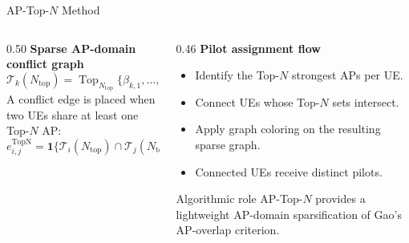 \documentclass[10pt,aspectratio=169]{beamer}
\newcommand{\TopN}{AP-Top-$N$}
\newenvironment{tightitemize}{%
    \begin{itemize}
        \setlength{\itemsep}{2pt}
        \setlength{\parskip}{0pt}
        \setlength{\parsep}{0pt}
}{%
    \end{itemize}
}
\begin{document}
\begin{frame}{AP-Top-\(N\) Method}
    \small
    \begin{columns}[T,onlytextwidth]
        \begin{column}{0.50\textwidth}
            \textbf{Sparse AP-domain conflict graph}
            \[
                \mathcal{T}_k(N_{\mathrm{top}})
                =
                \operatorname{Top}_{N_{\mathrm{top}}}
                \{\beta_{k,1},\ldots,\beta_{k,L}\}.
            \]
            A conflict edge is placed when two UEs share at least one Top-\(N\) AP:
            \[
                e_{i,j}^{\mathrm{TopN}}
                =
                \mathbf{1}\{
                \mathcal{T}_i(N_{\mathrm{top}})
                \cap
                \mathcal{T}_j(N_{\mathrm{top}})
                \neq \varnothing
                \}.
            \]
        \end{column}
        \begin{column}{0.46\textwidth}
            \textbf{Pilot assignment flow}
            \begin{tightitemize}
                \item Identify the Top-\(N\) strongest APs per UE.
                \item Connect UEs whose Top-\(N\) sets intersect.
                \item Apply graph coloring on the resulting sparse graph.
                \item Connected UEs receive distinct pilots.
            \end{tightitemize}

            \vspace{0.6em}
            \begin{block}{Algorithmic role}
                \TopN{} provides a lightweight AP-domain sparsification of Gao's AP-overlap criterion.
            \end{block}
        \end{column}
    \end{columns}
\end{frame}
\end{document}
